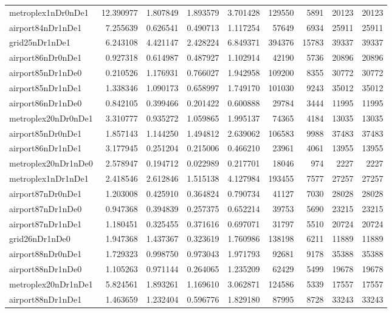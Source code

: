 \begin{longtable}{|l|r|r|r|r|r|r|r|r|}
metroplex1nDr0nDe1 & 12.390977 & 1.807849 & 1.893579 & 3.701428 & 129550 & 5891 & 20123 & 20123 \\
airport84nDr1nDe1 & 7.255639 & 0.626541 & 0.490713 & 1.117254 & 57649 & 6934 & 25911 & 25911 \\
grid25nDr1nDe1 & 6.243108 & 4.421147 & 2.428224 & 6.849371 & 394376 & 15783 & 39337 & 39337 \\
airport86nDr0nDe1 & 0.927318 & 0.614987 & 0.487927 & 1.102914 & 42190 & 5736 & 20896 & 20896 \\
airport85nDr1nDe0 & 0.210526 & 1.176931 & 0.766027 & 1.942958 & 109200 & 8355 & 30772 & 30772 \\
airport85nDr1nDe1 & 1.338346 & 1.090173 & 0.658997 & 1.749170 & 101030 & 9243 & 35012 & 35012 \\
airport86nDr1nDe0 & 0.842105 & 0.399466 & 0.201422 & 0.600888 & 29784 & 3444 & 11995 & 11995 \\
metroplex20nDr0nDe1 & 3.310777 & 0.935272 & 1.059865 & 1.995137 & 74365 & 4184 & 13035 & 13035 \\
airport85nDr0nDe1 & 1.857143 & 1.144250 & 1.494812 & 2.639062 & 106583 & 9988 & 37483 & 37483 \\
airport86nDr1nDe1 & 3.177945 & 0.251204 & 0.215006 & 0.466210 & 23961 & 4061 & 13955 & 13955 \\
metroplex20nDr1nDe0 & 2.578947 & 0.194712 & 0.022989 & 0.217701 & 18046 & 974 & 2227 & 2227 \\
metroplex1nDr1nDe1 & 2.418546 & 2.612846 & 1.515138 & 4.127984 & 193455 & 7577 & 27257 & 27257 \\
airport87nDr0nDe1 & 1.203008 & 0.425910 & 0.364824 & 0.790734 & 41127 & 7030 & 28028 & 28028 \\
airport87nDr1nDe0 & 0.947368 & 0.394839 & 0.257375 & 0.652214 & 39753 & 5690 & 23215 & 23215 \\
airport87nDr1nDe1 & 1.180451 & 0.325455 & 0.371616 & 0.697071 & 31797 & 5510 & 20724 & 20724 \\
grid26nDr1nDe0 & 1.947368 & 1.437367 & 0.323619 & 1.760986 & 138198 & 6211 & 11889 & 11889 \\
airport88nDr0nDe1 & 1.729323 & 0.998750 & 0.973043 & 1.971793 & 92681 & 9178 & 35388 & 35388 \\
airport88nDr1nDe0 & 1.105263 & 0.971144 & 0.264065 & 1.235209 & 62429 & 5499 & 19678 & 19678 \\
metroplex20nDr1nDe1 & 5.824561 & 1.893261 & 1.169610 & 3.062871 & 124586 & 5339 & 17557 & 17557 \\
airport88nDr1nDe1 & 1.463659 & 1.232404 & 0.596776 & 1.829180 & 87995 & 8728 & 33243 & 33243 \\

\end{longtable}
